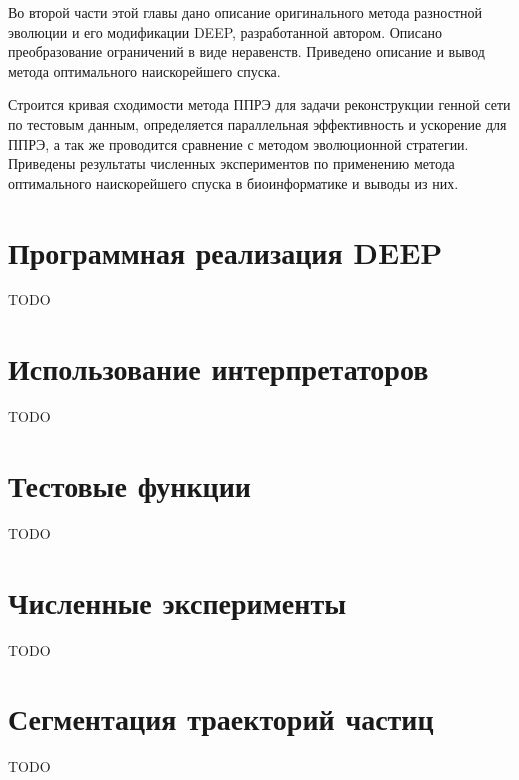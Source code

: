Во второй части этой главы дано описание оригинального метода разностной эволюции и его модификации DEEP, разработанной автором. Описано преобразование ограничений в виде неравенств. Приведено описание и вывод метода оптимального наискорейшего спуска.

Строится кривая сходимости метода ППРЭ для задачи реконструкции генной сети по тестовым данным, определяется параллельная эффективность и ускорение для ППРЭ, а так же проводится сравнение с методом эволюционной стратегии. Приведены результаты численных экспериментов по применению метода оптимального наискорейшего спуска в биоинформатике и выводы из них.


\section*{Программная реализация DEEP}
TODO

\section*{Использование интерпретаторов}
TODO

\section*{Тестовые функции}
TODO

\section*{Численные эксперименты}
TODO

\section*{Сегментация траекторий частиц}
TODO

